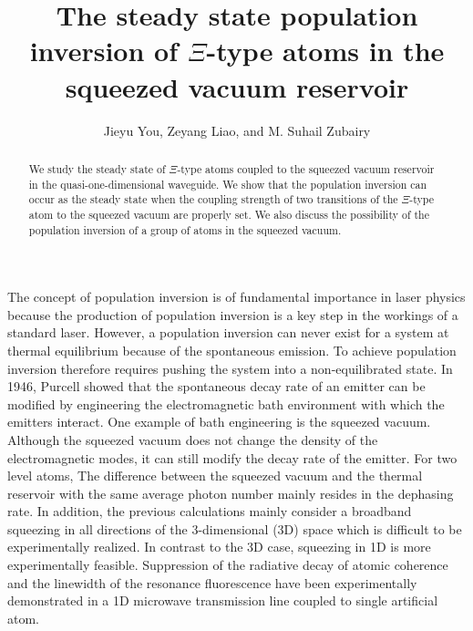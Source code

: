 \documentclass[aps,showpacs,twocolumn,twoside,groupedaddress]{revtex4}
\begin{document}
\title{The steady state population inversion of $\Xi$-type atoms in the squeezed vacuum reservoir}
\author{Jieyu You, Zeyang Liao, and M. Suhail Zubairy}

\begin{abstract}
We study the steady state of $\Xi$-type atoms coupled to the squeezed vacuum reservoir in the quasi-one-dimensional waveguide. We show that the population inversion can occur as the steady state when the coupling strength of two transitions of the $\Xi$-type atom to the squeezed vacuum are properly set. We also discuss the possibility of the population inversion of a group of atoms in the squeezed vacuum. 
\end{abstract}
\maketitle 


The concept of population inversion is of fundamental importance in laser physics because the production of population inversion is a key step in the workings of a standard laser. However, a population inversion can never exist for a system at thermal equilibrium because of the spontaneous emission. To achieve population inversion therefore requires pushing the system into a non-equilibrated state\cite{svelto1998principles}. In 1946, Purcell showed that the spontaneous decay rate of an emitter can be modified by engineering the electromagnetic bath environment with which the emitters interact\cite{purcell1946purcell}. One example of bath engineering is the squeezed vacuum. Although the squeezed vacuum does not change the density of the electromagnetic modes, it can still modify the decay rate of the emitter\cite{gardiner1986cw, collett1984mj,gea1988vacuum}. For two level atoms, The difference between the squeezed vacuum and the thermal reservoir with the same average photon number mainly resides in the dephasing rate\cite{gardiner1987cw, palma1989gm, agarwal1990cooperative, ficek1990spontaneous,ficek1991z, goldstein1996ev}. In addition, the previous calculations mainly consider a broadband squeezing
in all directions of the 3-dimensional (3D) space which is difficult to be experimentally realized. In contrast
to the 3D case, squeezing in 1D is more experimentally feasible. Suppression of the radiative decay of atomic coherence and the linewidth of the resonance fluorescence have been experimentally demonstrated in a 1D microwave transmission line coupled to single artificial atom\cite{turchette1998qa,murch2013kw, toyli2016resonance, bergeal2010analog, wang2018cavity,qin2018exponentially}. 
\end{document}
